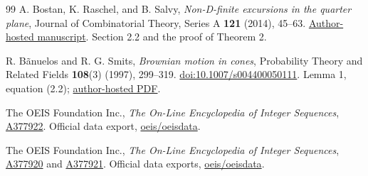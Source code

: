 \documentclass[11pt,letterpaper]{article}
\numberwithin{equation}{section}
\theoremstyle{remark}\newtheorem{remark}[theorem]{Remark}
\begin{document}
\begin{thebibliography}{99}
A. Bostan, K. Raschel, and B. Salvy,
\emph{Non-D-finite excursions in the quarter plane},
Journal of Combinatorial Theory, Series A \textbf{121} (2014), 45--63.
\href{https://specfun.inria.fr/bostan/publications/BoRaSa12.pdf}{Author-hosted manuscript}.
Section 2.2 and the proof of Theorem 2.

R. B\~anuelos and R. G. Smits,
\emph{Brownian motion in cones},
Probability Theory and Related Fields \textbf{108}(3) (1997), 299--319.
\href{https://doi.org/10.1007/s004400050111}{doi:10.1007/s004400050111}.
Lemma 1, equation (2.2); \href{https://www.math.purdue.edu/~banuelos/Papers/cones.pdf}{author-hosted PDF}.

The OEIS Foundation Inc., \emph{The On-Line Encyclopedia of Integer Sequences},
\href{https://oeis.org/A377922}{A377922}.
Official data export, \href{https://github.com/oeis/oeisdata/blob/main/seq/A377/A377922.seq}{oeis/oeisdata}.

The OEIS Foundation Inc., \emph{The On-Line Encyclopedia of Integer Sequences},
\href{https://oeis.org/A377920}{A377920} and
\href{https://oeis.org/A377921}{A377921}.
Official data exports, \href{https://github.com/oeis/oeisdata/tree/main/seq/A377}{oeis/oeisdata}.
\end{thebibliography}
\end{document}
